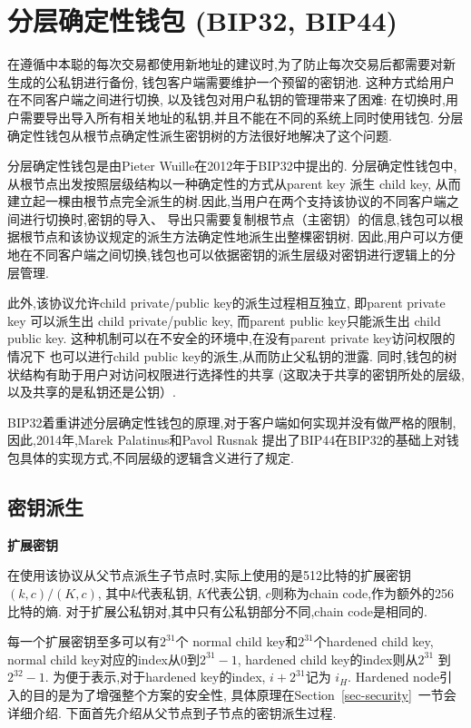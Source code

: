 \section{分层确定性钱包 (BIP32, BIP44)}

在遵循中本聪的每次交易都使用新地址的建议时,为了防止每次交易后都需要对新生成的公私钥进行备份,
钱包客户端需要维护一个预留的密钥池. 这种方式给用户在不同客户端之间进行切换, 以及钱包对用户私钥的管理带来了困难:
在切换时,用户需要导出导入所有相关地址的私钥,并且不能在不同的系统上同时使用钱包.
分层确定性钱包从根节点确定性派生密钥树的方法很好地解决了这个问题.

分层确定性钱包是由Pieter Wuille在2012年于BIP32中提出的.
分层确定性钱包中, 从根节点出发按照层级结构以一种确定性的方式从parent key 派生 child key,
从而建立起一棵由根节点完全派生的树.因此,当用户在两个支持该协议的不同客户端之间进行切换时,密钥的导入、
导出只需要复制根节点（主密钥）的信息,钱包可以根据根节点和该协议规定的派生方法确定性地派生出整棵密钥树.
因此,用户可以方便地在不同客户端之间切换,钱包也可以依据密钥的派生层级对密钥进行逻辑上的分层管理.
  
此外,该协议允许child private/public key的派生过程相互独立,
即parent private key 可以派生出 child private/public key,
而parent public key只能派生出 child public key.
这种机制可以在不安全的环境中,在没有parent private key访问权限的情况下
也可以进行child public key的派生,从而防止父私钥的泄露.
同时,钱包的树状结构有助于用户对访问权限进行选择性的共享
(这取决于共享的密钥所处的层级,以及共享的是私钥还是公钥）.  

BIP32着重讲述分层确定性钱包的原理,对于客户端如何实现并没有做严格的限制,
因此,2014年,Marek Palatinus和Pavol Rusnak 
提出了BIP44在BIP32的基础上对钱包具体的实现方式,不同层级的逻辑含义进行了规定.

\subsection{密钥派生}

\textbf{扩展密钥}

在使用该协议从父节点派生子节点时,实际上使用的是512比特的扩展密钥$(k,c)/(K,c)$,
其中$k$代表私钥, $K$代表公钥, $c$则称为chain code,作为额外的256比特的熵.
对于扩展公私钥对,其中只有公私钥部分不同,chain code是相同的.
 
每一个扩展密钥至多可以有$2^{31}$个 normal child key和$2^{31}$个hardened child key, 
normal child key对应的index从0到$2^{31}-1$, hardened child key的index则从$2^{31}$ 到$2^{32}-1$.
为便于表示,对于hardened key的index, $i+2^{31}$记为 $i_H$.
Hardened node引入的目的是为了增强整个方案的安全性,
具体原理在Section~\ref{sec-security}~一节会详细介绍.
下面首先介绍从父节点到子节点的密钥派生过程.

